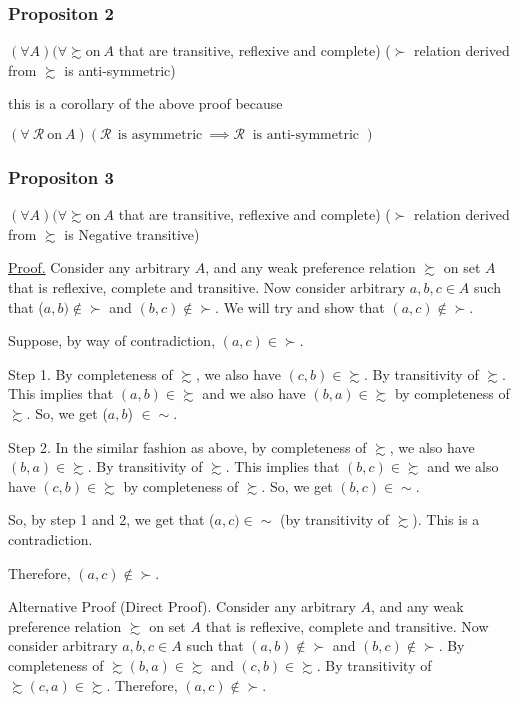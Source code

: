\documentclass[12pt,a4paper]{article}
\begin{document}
    \subsubsection*{Propositon 2} 
    \(\left( \forall A  \right) (\forall \succsim  \text{on} \ A \)
    that are 
    transitive, reflexive and complete) (\(\succ \) relation derived from \(\succsim \) is anti-symmetric)   
    
    this is a corollary of the above proof because 

    \(\left( \forall \ \mathcal{R} \ \text{on} \ A \right)(\mathcal{R} \ \ \text{is asymmetric} \ \implies \mathcal{R} \ \text{ is anti-symmetric } ) \)  
\pagebreak 

    \subsubsection*{Propositon 3} 
    \(\left( \forall A  \right) (\forall \succsim  \text{on} \ A \)
    that are 
    transitive, reflexive and complete) (\(\succ \) relation derived from \(\succsim \) is Negative transitive)   

   \begin{tcolorbox}
    \underline{Proof.} Consider any arbitrary \(A\), and any weak preference relation \(\succsim \) on set \(A\) that is reflexive, complete and transitive. Now consider arbitrary \(a, b, c \in A\) such that (\(a, b) \notin \succ \) and \((b, c) \notin \succ \). We will try and show that \((a, c) \notin \succ \).

    Suppose, by way of contradiction, \((a, c) \in \succ \).

    Step 1. By completeness of \(\succsim \), we also have \((c, b) \in \succsim \). By transitivity of \(\succsim \). This implies that \((a, b) \in \succsim \) and we also have \((b, a) \in \succsim \) by completeness of \(\succsim \). So, we get (\(a, b\)) \(\in \sim \).

    Step 2. In the similar fashion as above, by completeness of \(\succsim \), we also have \((b, a) \in \succsim \). By transitivity of \(\succsim \). This implies that \((b, c) \in \succsim \) and we also have \((c, b) \in \succsim \) by completeness of \(\succsim \). So, we get \((b, c) \in \sim \).

    So, by step 1 and 2, we get that (\(a, c) \in \sim \) (by transitivity of \(\succsim \)). This is a contradiction.
    
    Therefore, \((a, c) \notin \succ \).

    Alternative Proof (Direct Proof). Consider any arbitrary \(A\), and any weak preference relation \(\succsim \) on set \(A\) that is reflexive, complete and transitive. Now consider arbitrary \(a, b, c \in A\) such that \((a, b) \notin \succ \) and \((b, c) \notin \succ \). 
    By completeness of \(\succsim(b, a) \in \succsim \) and \((c, b) \in \succsim \). By transitivity of \(\succsim(c, a) \in \succsim \). Therefore, \((a, c) \notin \succ \).
  \end{tcolorbox}
\end{document}
